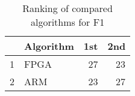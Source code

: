 \begin{table}
\footnotesize
\caption{Ranking of compared algorithms for F1}
\label{tab:places F1}
\begin{tabular}{llrr}
\hline
 & Algorithm & 1st & 2nd \\
\hline
1 & FPGA & 27 & 23 \\
2 & ARM & 23 & 27 \\
\hline
\end{tabular}
\end{table}
